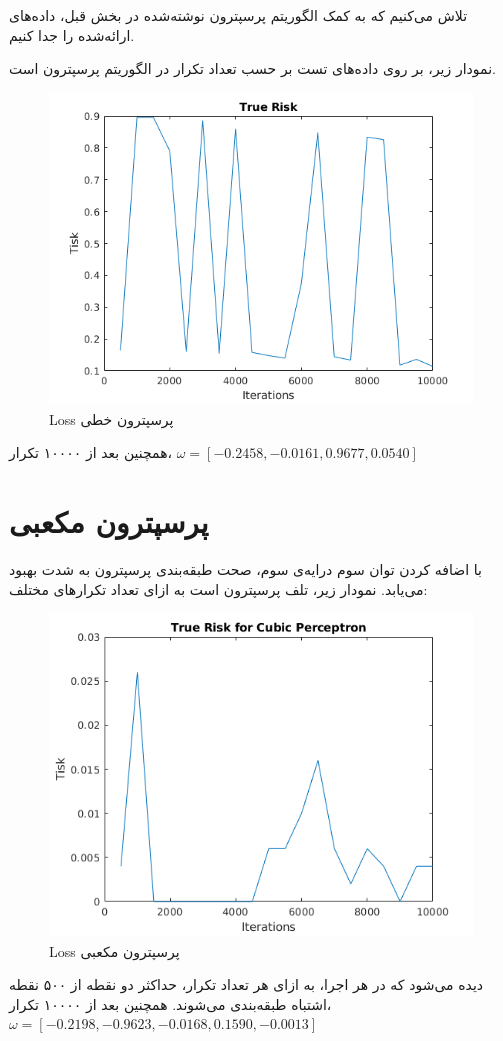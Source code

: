 \documentclass[a4paper]{article}
\begin{document}
 تلاش می‌کنیم که به کمک الگوریتم پرسپترون نوشته‌شده در بخش قبل، داده‌های ارائه‌شده را جدا کنیم. 
 
 نمودار زیر، 
 بر روی داده‌های تست  بر حسب تعداد تکرار در الگوریتم پرسپترون است.
 
 \begin{figure}[h!]
 	\centering
 	\includegraphics[scale=0.5]{linperc.png}
 	\caption{Loss
 	پرسپترون خطی
 }
 \end{figure}

همچنین بعد از ۱۰۰۰۰ تکرار،
$ \omega = [-0.2458,
-0.0161,
0.9677,
0.0540]$
\section{پرسپترون مکعبی}
 با اضافه کردن توان سوم درایه‌ی سوم، صحت طبقه‌بندی پرسپترون به شدت بهبود می‌یابد. نمودار زیر، تلف پرسپترون است به  ازای تعداد تکرارهای مختلف:
 
 
 \begin{figure}[h!]
 	\centering
 	\includegraphics[scale=0.5]{cube.png}
 	\caption{Loss
 		پرسپترون مکعبی
 	}
 \end{figure}
دیده‌ می‌شود که در هر اجرا، به ازای هر تعداد تکرار، حداکثر دو نقطه از ۵۰۰ نقطه اشتباه طبقه‌بندی می‌شوند.
همچنین بعد از ۱۰۰۰۰ تکرار،
$ \omega = [
-0.2198,
-0.9623,
-0.0168,
0.1590,
-0.0013]$
\end{document}
